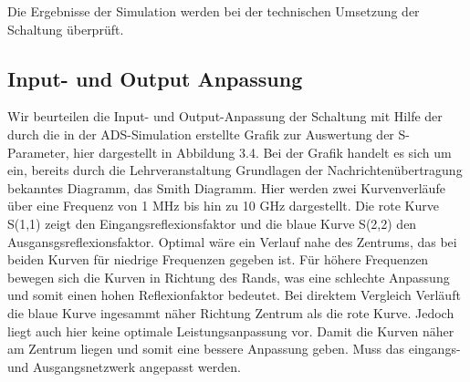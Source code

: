 Die Ergebnisse der Simulation werden bei der technischen Umsetzung der Schaltung überprüft. 
\subsection{Input- und Output Anpassung}
Wir beurteilen die Input- und Output-Anpassung der Schaltung mit Hilfe der durch die in der ADS-Simulation erstellte Grafik 
zur Auswertung der S-Parameter, hier dargestellt in Abbildung 3.4. Bei der Grafik handelt es sich um ein, bereits durch die 
Lehrveranstaltung Grundlagen der Nachrichtenübertragung bekanntes Diagramm,  das Smith Diagramm. Hier werden zwei 
Kurvenverläufe über eine Frequenz von 1 MHz bis hin zu 10 GHz dargestellt. Die rote Kurve S(1,1) zeigt den 
Eingangsreflexionsfaktor und die blaue Kurve S(2,2) den Ausgansgsreflexionsfaktor. Optimal wäre ein Verlauf nahe des
Zentrums, das bei beiden Kurven für niedrige Frequenzen gegeben ist. Für höhere Frequenzen bewegen sich die Kurven in 
Richtung des Rands, was eine schlechte Anpassung  und somit einen hohen Reflexionfaktor bedeutet. Bei direktem Vergleich 
Verläuft die blaue Kurve ingesammt näher Richtung Zentrum als die rote Kurve. Jedoch liegt auch hier keine optimale 
Leistungsanpassung vor.
Damit die Kurven näher am Zentrum liegen und somit eine bessere Anpassung geben. Muss das eingangs- und Ausgangsnetzwerk 
angepasst werden. 
\clearpage
%
%


